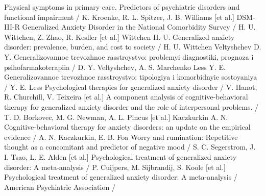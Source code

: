 \documentclass[twocolumn]{article}
\begin{document}
\begin{thebibliography}{26}
Physical symptoms in primary care. Predictors of psychiatric disorders and functional impairment / K. Kroenke, R. L. Spitzer, J. B. Williams [et al.]
DSM-III-R Generalized Anxiety Disorder in the National Comorbidity Survey / H. U. Wittchen, Z. Zhao, R. Kesller [et al.]
Wittchen H. U. Generalized anxiety disorder: prevalence, burden, and cost to society / H. U. Wittchen 
Veltyshchev D. Y. Generalizovannoe trevozhnoe rasstroystvo: problemyi diagnostiki, prognoza i psihofarmakoterapiia / D. Y. Veltyshchev, A. S. Marchenko 
Less Y. E. Generalizovannoe trevozhnoe rasstroystvo: tipologiya i komorbidnyie sostoyaniya / Y. E. Less 
Psychological therapies for generalized anxiety disorder / V. Hanot, R. Churchill, V. Teixeira [et al.]
A component analysis of cognitive-behavioral therapy for generalized anxiety disorder and the role of interpersonal problems. / T. D. Borkovec, M. G. Newman, A. L. Pincus [et al.]
Kaczkurkin A. N. Cognitive-behavioral therapy for anxiety disorders: an update on the empirical evidence / A. N. Kaczkurkin, E. B. Foa 
Worry and rumination: Repetitive thought as a concomitant and predictor of negative mood / S. C. Segerstrom, J. I. Tsao, L. E. Alden [et al.]
Psychological treatment of generalized anxiety disorder: A meta-analysis / P. Cuijpers, M. Sijbrandij, S. Koole [et al.]
Psychological treatment of generalized anxiety disorder: A meta-analysis / American Psychiatric Association / 
\end{thebibliography}
\end{document}
